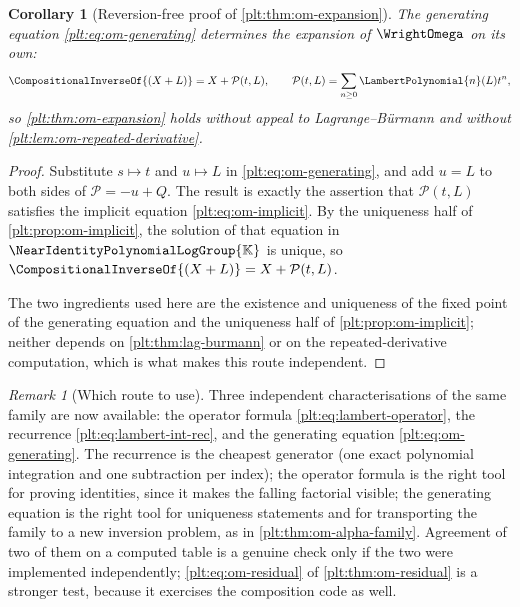 \documentclass[11pt,oneside]{article}
\theoremstyle{plain}
\newtheorem{corollary}[theorem]{Corollary}
\theoremstyle{definition}
\theoremstyle{remark}
\newtheorem{remark}[theorem]{Remark}
\newcommand{\K}{\mathbb{K}}
\newcommand{\Gnear}{\NearIdentityPolynomialLogGroup{\K}} %
\newcommand{\rev}[1]{\CompositionalInverseOf{#1}}
\newcommand{\LamP}[1]{\LambertPolynomial{#1}}
\begin{document}
\begin{corollary}[Reversion-free proof of \cref{plt:thm:om-expansion}]
\label{plt:cor:om-reversion-free}
The generating equation \eqref{plt:eq:om-generating} determines the expansion
of \(\WrightOmega\) on its own:
\[
  \rev{(X+L)}=X+\mathcal P(t,L),
  \qquad
  \mathcal P(t,L)=\sum_{n\ge0}\LamP{n}(L)t^{n},
\]
so \cref{plt:thm:om-expansion} holds without appeal to Lagrange--B\"urmann and
without \cref{plt:lem:om-repeated-derivative}.
\end{corollary}

\begin{proof}
Substitute \(s\mapsto t\) and \(u\mapsto L\) in
\eqref{plt:eq:om-generating}, and add \(u=L\) to both sides of
\(\mathcal P=-u+Q\).  The result is exactly the assertion that
\(\mathcal P(t,L)\) satisfies the implicit equation
\eqref{plt:eq:om-implicit}.  By the uniqueness half of
\cref{plt:prop:om-implicit}, the solution of that equation in
\(\Gnear\) is unique, so \(\rev{(X+L)}=X+\mathcal P(t,L)\).

The two ingredients used here are the existence and uniqueness of the fixed
point of the generating equation and the uniqueness half of
\cref{plt:prop:om-implicit}; neither depends on
\cref{plt:thm:lag-burmann} or on the repeated-derivative computation, which is
what makes this route independent.
\end{proof}

\begin{remark}[Which route to use]
\label{plt:rmk:om-routes}
Three independent characterisations of the same family are now available: the
operator formula \eqref{plt:eq:lambert-operator}, the recurrence
\eqref{plt:eq:lambert-int-rec}, and the generating equation
\eqref{plt:eq:om-generating}.  The recurrence is the cheapest generator
(one exact polynomial integration and one subtraction per index); the
operator formula is the right tool for proving identities, since it makes the
falling factorial visible; the generating equation is the right tool for
uniqueness statements and for transporting the family to a new inversion
problem, as in \cref{plt:thm:om-alpha-family}.  Agreement of two of them on a
computed table is a genuine check only if the two were implemented
independently; \eqref{plt:eq:om-residual} of \cref{plt:thm:om-residual} is a
stronger test, because it exercises the composition code as well.
\end{remark}
\end{document}
